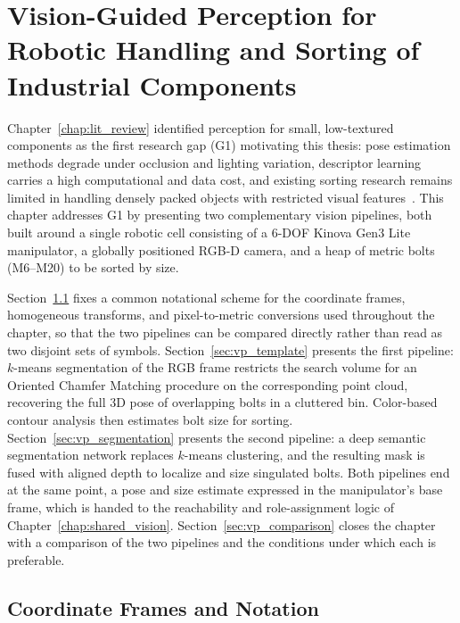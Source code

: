 \chapter{Vision-Guided Perception for Robotic Handling and Sorting of Industrial Components}
\label{chap:vision_pipelines}

Chapter~\ref{chap:lit_review} identified perception for small, low-textured components as the
first research gap (G1) motivating this thesis: pose estimation methods degrade under occlusion
and lighting variation, descriptor learning carries a high computational and data cost, and
existing sorting research remains limited in handling densely packed objects with restricted
visual features~\citep{sk2024bolthandling,sk2024boltsorting}. This chapter addresses G1 by
presenting two complementary vision pipelines, both built around a single robotic cell consisting
of a 6-DOF Kinova Gen3 Lite manipulator, a globally positioned RGB-D camera, and a heap of metric
bolts (M6--M20) to be sorted by size.

Section~\ref{sec:vp_notation} fixes a common notational scheme for the coordinate frames,
homogeneous transforms, and pixel-to-metric conversions used throughout the chapter, so that the
two pipelines can be compared directly rather than read as two disjoint sets of symbols.
Section~\ref{sec:vp_template} presents the first pipeline: $k$-means segmentation of the RGB frame
restricts the search volume for an Oriented Chamfer Matching procedure on the corresponding
point cloud, recovering the full 3D pose of overlapping bolts in a cluttered bin. Color-based
contour analysis then estimates bolt size for sorting. Section~\ref{sec:vp_segmentation} presents
the second pipeline: a deep semantic segmentation network replaces $k$-means clustering, and the
resulting mask is fused with aligned depth to localize and size singulated bolts. Both pipelines
end at the same point, a pose and size estimate expressed in the manipulator's base frame, which
is handed to the reachability and role-assignment logic of Chapter~\ref{chap:shared_vision}.
Section~\ref{sec:vp_comparison} closes the chapter with a comparison of the two pipelines and the
conditions under which each is preferable.

\section{Coordinate Frames and Notation}\label{sec:vp_notation}

